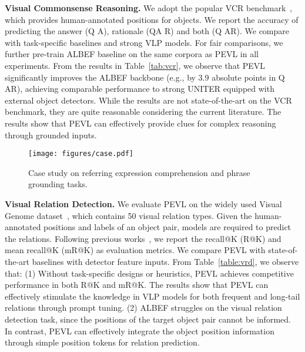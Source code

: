 \documentclass[11pt]{article}
\begin{document}
\smallskip
\textbf{Visual Commonsense Reasoning.}
We adopt the popular VCR benchmark~\cite{zellers2019recognition}, which provides human-annotated positions for objects. We report the accuracy of predicting the answer (Q  A), rationale (QA  R) and both (Q  AR). We compare with task-specific baselines and strong VLP models. For fair comparisons, we further pre-train ALBEF baseline on the same corpora as PEVL in all experiments. From the results in Table~\ref{tab:vcr}, we observe that PEVL significantly improves the ALBEF backbone (e.g., by 3.9 absolute points in Q  AR), achieving comparable performance to strong UNITER equipped with external object detectors. While the results are not state-of-the-art on the VCR benchmark, they are quite reasonable considering the current literature. The results show that PEVL can effectively provide clues for complex reasoning through grounded inputs.













\begin{figure*}[!t]
    \centering
    \texttt{[image: figures/case.pdf]}
\caption{Case study on referring expression comprehension and phrase grounding tasks. }
    \label{fig:case}
\end{figure*}

\smallskip
\textbf{Visual Relation Detection.} We evaluate PEVL on the widely used Visual Genome dataset~\cite{krishna2017visual}, which contains 50 visual relation types. Given the human-annotated positions and labels of an object pair, models are required to predict the relations. Following previous works~\cite{tang2020unbiased,lin2020gps}, we report the recall@K (R@K) and mean recall@K (mR@K) as evaluation metrics. We compare PEVL with state-of-the-art baselines with detector feature inputs. From Table~\ref{table:vrd}, we observe that: (1) Without task-specific designs or heuristics, PEVL achieves competitive performance in both R@K and mR@K. The results show that PEVL can effectively stimulate the knowledge in VLP models for both frequent and long-tail relations through prompt tuning. (2) ALBEF struggles on the visual relation detection task, since the positions of the target object pair cannot be informed. In contrast, PEVL can effectively integrate the object position information through simple position tokens for relation prediction.
\end{document}
